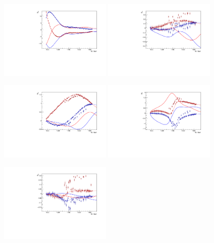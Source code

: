 \documentclass[a4paper,12pt]{report}
\begin{document}
\begin{figure}
  \begin{center}
    \centerline{
    \includegraphics[width=0.49\textwidth]{BnGa/PenHeli/plots.0/E0p.pdf}
    \includegraphics[width=0.49\textwidth]{BnGa/PenHeli/plots.0/E1p.pdf}
    }
    \centerline{
    \includegraphics[width=0.49\textwidth]{BnGa/PenHeli/plots.0/M1p.pdf}
    \includegraphics[width=0.49\textwidth]{BnGa/PenHeli/plots.0/M1m.pdf}
    }
    \centerline{
    \includegraphics[width=0.49\textwidth]{BnGa/PenHeli/plots.0/E2p.pdf}
}
\end{center}
\end{figure}
\end{document}
